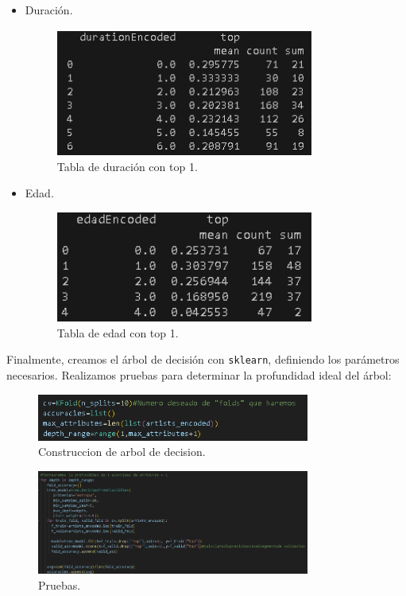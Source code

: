 \documentclass[a4paper,12pt]{article}
\begin{document}
\begin{itemize}
\begin{figure}[H]
    \end{figure}
    \item Duración.
    \begin{figure}[H]
        \centering
        \includegraphics[width=0.8\textwidth]{24.png}
        \caption{Tabla de duración con top 1.}

    \end{figure}
    \item Edad.
    \begin{figure}[H]
        \centering
        \includegraphics[width=0.8\textwidth]{25.png}
        \caption{Tabla de edad con top 1.}

    \end{figure}
\end{itemize}

Finalmente, creamos el árbol de decisión con \texttt{sklearn}, definiendo los parámetros necesarios. Realizamos pruebas para determinar la profundidad ideal del árbol:

\begin{figure}[H]
    \centering
    \includegraphics[width=0.8\textwidth]{26.png}
    \caption{Construccion de arbol de decision.}
\end{figure}

\begin{figure}[H]
    \centering
    \includegraphics[width=0.8\textwidth]{27.png}
    \caption{Pruebas.}
\end{figure}
\end{document}
